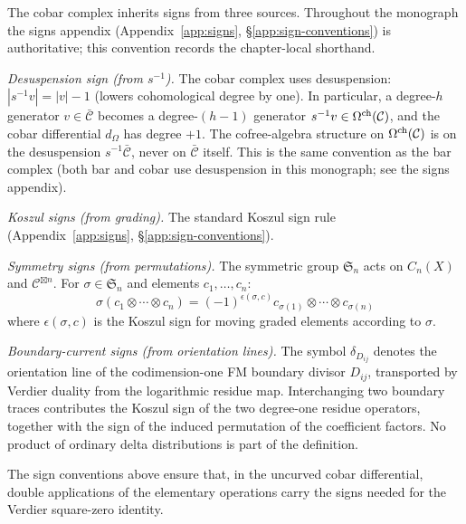 \begin{convention}\label{conv:cobar-signs}
The cobar complex inherits signs from three sources. Throughout the
monograph the signs appendix
(Appendix~\ref{app:signs}, \S\ref{app:sign-conventions}) is
authoritative; this convention records the chapter-local shorthand.

\emph{Desuspension sign (from $s^{-1}$).}
The cobar complex uses desuspension: $|s^{-1}v| = |v| - 1$ (lowers
cohomological degree by one). In particular, a degree-$h$ generator
$v \in \bar{\mathcal{C}}$ becomes a degree-$(h{-}1)$ generator
$s^{-1}v \in \Omega^{\mathrm{ch}}(\mathcal{C})$, and the cobar differential
$d_\Omega$ has degree $+1$. The cofree-algebra structure on
$\Omega^{\mathrm{ch}}(\mathcal{C})$ is on the desuspension $s^{-1}\bar{\mathcal{C}}$,
never on $\bar{\mathcal{C}}$ itself. This is the same convention as
the bar complex (both bar and cobar use desuspension in this
monograph; see the signs appendix).

\emph{Koszul signs (from grading).}
The standard Koszul sign rule (Appendix~\ref{app:signs}, \S\ref{app:sign-conventions}).

\emph{Symmetry signs (from permutations).}
The symmetric group $\mathfrak{S}_n$ acts on $C_n(X)$ and $\mathcal{C}^{\boxtimes n}$.
For $\sigma \in \mathfrak{S}_n$ and elements $c_1, \ldots, c_n$:
\[\sigma(c_1 \otimes \cdots \otimes c_n) = (-1)^{\epsilon(\sigma, c)}
c_{\sigma(1)} \otimes \cdots \otimes c_{\sigma(n)}\]
where $\epsilon(\sigma, c)$ is the Koszul sign for moving graded elements according
to $\sigma$.

\emph{Boundary-current signs (from orientation lines).}
The symbol $\delta_{D_{ij}}$ denotes the orientation line of the
codimension-one FM boundary divisor $D_{ij}$, transported by Verdier
duality from the logarithmic residue map. Interchanging two boundary
traces contributes the Koszul sign of the two degree-one residue
operators, together with the sign of the induced permutation of the
coefficient factors. No product of ordinary delta distributions is
part of the definition.
\end{convention}

\begin{lemma}\label{lem:cobar-sign-consistency}
The sign conventions above ensure that, in the uncurved cobar
differential, double applications of the elementary operations carry
the signs needed for the Verdier square-zero identity.
\end{lemma}

